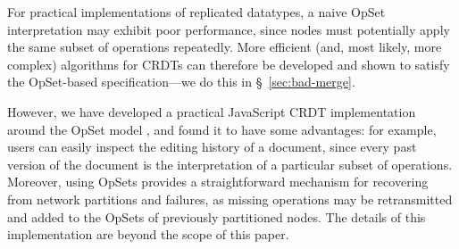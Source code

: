 For practical implementations of replicated datatypes, a naive OpSet interpretation may exhibit poor performance, since nodes must potentially apply the same subset of operations repeatedly.
More efficient (and, most likely, more complex) algorithms for CRDTs can therefore be developed and shown to satisfy the OpSet-based specification---we do this in \S~\ref{sec:bad-merge}.

However, we have developed a practical JavaScript CRDT implementation around the OpSet model \cite{Automerge}, and found it to have some advantages: for example, users can easily inspect the editing history of a document, since every past version of the document is the interpretation of a particular subset of operations.
Moreover, using OpSets provides a straightforward mechanism for recovering from network partitions and failures, as missing operations may be retransmitted and added to the OpSets of previously partitioned nodes.
The details of this implementation are beyond the scope of this paper.

